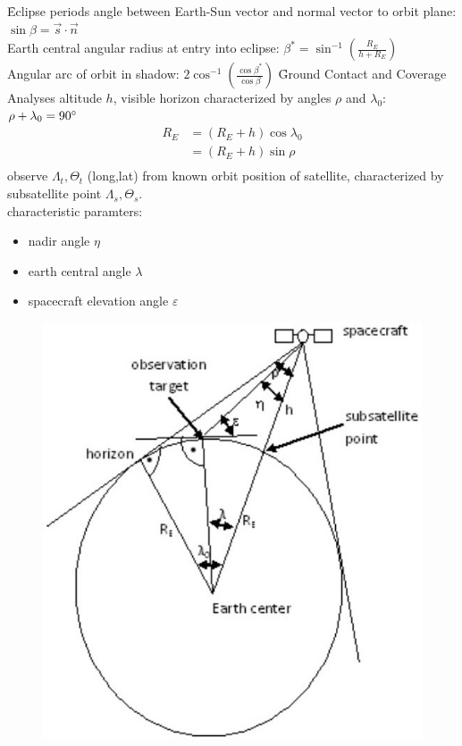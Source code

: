 \f{Eclipse periods}
angle between Earth-Sun vector and normal vector to orbit plane: $\sin \beta = \vec{s}\cdot\vec{n}$\\
Earth central angular radius at entry into eclipse: $\beta^* = \sin^{-1}\left(\frac{R_E}{h+R_E}\right)$\\
Angular arc of orbit in shadow: $2\cos^{-1}\left(\frac{\cos \beta^*}{\cos \beta}\right)$
\f{Ground Contact and Coverage Analyses}
altitude $h$, visible horizon characterized by angles $\rho$ and $\lambda_0$: $\rho + \lambda_0 = 90\degree$
\begin{align*}
 R_E &= (R_E + h) \cos \lambda_0\\
 &= (R_E +h) \sin \rho\\
\end{align*}
observe $\Lambda_t, \Theta_t$ (long,lat) from known orbit position of satellite, characterized by subsatellite point $\Lambda_s, \Theta_s$.\\
characteristic paramters:
\begin{itemize}
 \item nadir angle $\eta$
 \item earth central angle $\lambda$
 \item spacecraft elevation angle $\varepsilon$
\end{itemize}
\begin{figure}[!ht]
 \centering
 \includegraphics[scale=0.6]{groundcoverage}
\end{figure}
